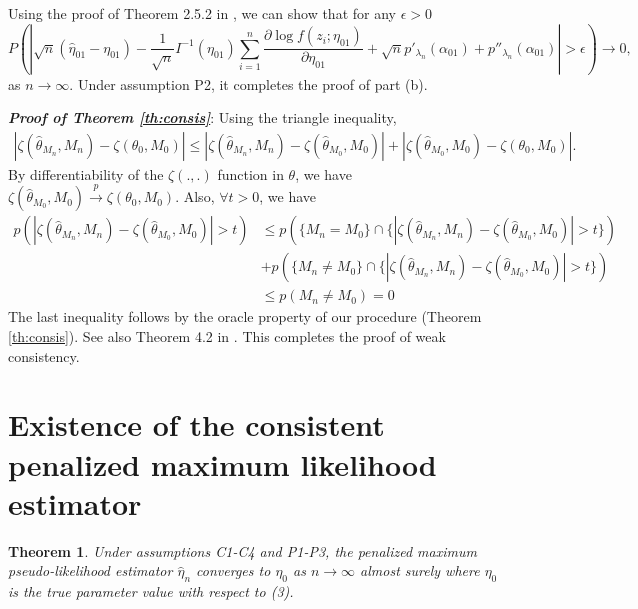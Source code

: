 \documentclass[11pt]{statsoc}
\newtheorem{theorem}{Theorem}
\begin{document}
Using the proof of Theorem 2.5.2 in \cite{MR1245941},  we can show that for any $\epsilon>0$
\[
P\left( \left|\sqrt n (\hat \eta_{01}-\eta_{01})- \frac{1}{\sqrt n} I^{-1}(\eta_{01}) \sum_{i=1}^n \frac{\partial \log f(z_i; \eta_{01})}{\partial \eta_{01}} + \sqrt np'_{\lambda_n}(\alpha_{01}) + p''_{\lambda_n}(\alpha_{01})    \right| >\epsilon \right) \rightarrow 0,
\]
as $n \rightarrow \infty$. Under assumption P2, it completes the proof of part (b). {\nobreak \ifvmode \relax \else
      \ifdim\lastskip<1.5em \hskip-\lastskip
      \hskip1.5em plus0em minus0.5em \fi \nobreak
      \vrule height0.75em width0.5em depth0.25em\fi}

\textbf{\it{Proof of Theorem \ref{th:consis}}}: 
Using the triangle inequality,
\begin{align*}
|\zeta(\hat \theta_{M_n},M_n)-\zeta(\theta_{0},M_0)| \leq |\zeta(\hat \theta_{M_n},M_n)-\zeta(\hat \theta_{M_0},M_0)|+|\zeta(\hat \theta_{M_0},M_0)-\zeta( \theta_{0},M_0)|.
\end{align*}
By differentiability of the $\zeta(.,.)$ function in $\theta$, we have $\zeta(\hat \theta_{M_0},M_0) {\stackrel{p}{\longrightarrow}} \zeta(\theta_{0},M_0)$. Also, $\forall t>0$, we have
\begin{align*}
 p(|\zeta(\hat \theta_{M_n},M_n)-\zeta(\hat \theta_{M_0},M_0)|>t) &\leq p(\{M_n=M_0\} \cap \{|\zeta(\hat \theta_{M_n},M_n)-\zeta(\hat \theta_{M_0},M_0)|>t\}) \\
 &+ p(\{M_n \neq M_0\} \cap \{|\zeta(\hat \theta_{M_n},M_n)-\zeta(\hat \theta_{M_0},M_0)|>t\})\\
 &\leq p(M_n \neq M_0) = 0
\end{align*}
The last inequality follows by the oracle property of our procedure (Theorem \ref{th:consis}). See also Theorem 4.2 in \cite{wasserman2009high}.  This completes the proof of weak consistency.

\section{Existence of the consistent penalized maximum likelihood estimator }
\label{app:PMLEexists}

\begin{theorem}
Under assumptions C1-C4 and P1-P3, the penalized maximum pseudo-likelihood estimator $\widehat \eta_{n}$ converges to $\eta_0$ as $n \rightarrow \infty$ almost surely where $\eta_0$ is the true parameter value with respect to (3).
\label{th:PMLEexists}
\end{theorem}
\end{document}
